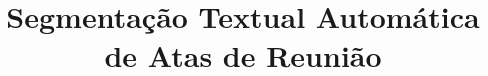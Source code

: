 \documentclass[conference]{IEEEtran}
\begin{document}
\title{Segmentação Textual Automática de Atas de Reunião}



\newcommand{\urlatas}{http://www.ppgccs.net/?page\_id=1150}
\newcommand{\urlbrowcorpus}{http://clu.uni.no/icame/brown/bcm.html}
\newcommand{\urlreuterscorpus}{http://trec.nist.gov/data/reuters/reuters.html}
\newcommand{\urlicsi}{http://www1.icsi.berkeley.edu/Speech/mr}



\maketitle


\IEEEpeerreviewmaketitle



	
	
	
	
		
	
	
	



\end{document}
